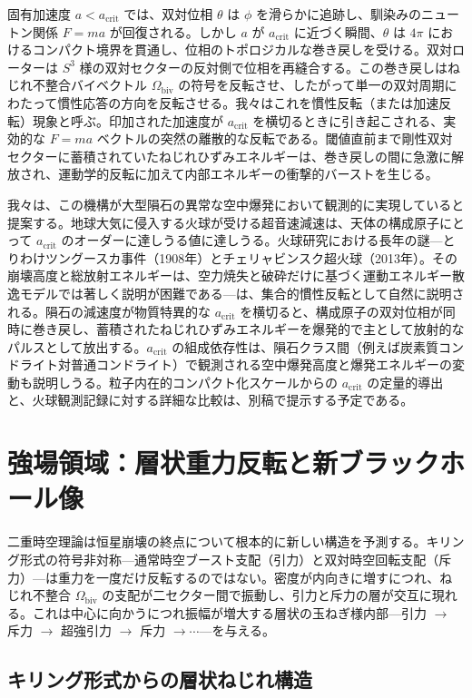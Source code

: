 \documentclass[dvipdfmx,a4paper]{article}
\begin{document}
固有加速度 $a < a_\text{crit}$ では、双対位相 $\theta$ は $\phi$ を滑らかに追跡し、馴染みのニュートン関係 $F = ma$ が回復される。しかし $a$ が $a_\text{crit}$ に近づく瞬間、$\theta$ は $4\pi$ におけるコンパクト境界を貫通し、位相のトポロジカルな巻き戻しを受ける。双対ローターは $S^3$ 様の双対セクターの反対側で位相を再縫合する。この巻き戻しはねじれ不整合バイベクトル $\Omega_\text{biv}$ の符号を反転させ、したがって単一の双対周期にわたって慣性応答の方向を反転させる。我々はこれを慣性反転（または加速反転）現象と呼ぶ。印加された加速度が $a_\text{crit}$ を横切るときに引き起こされる、実効的な $F = ma$ ベクトルの突然の離散的な反転である。閾値直前まで剛性双対セクターに蓄積されていたねじれひずみエネルギーは、巻き戻しの間に急激に解放され、運動学的反転に加えて内部エネルギーの衝撃的バーストを生じる。

我々は、この機構が大型隕石の異常な空中爆発において観測的に実現していると提案する。地球大気に侵入する火球が受ける超音速減速は、天体の構成原子にとって $a_\text{crit}$ のオーダーに達しうる値に達しうる。火球研究における長年の謎---とりわけツングースカ事件（1908年）とチェリャビンスク超火球（2013年）。その崩壊高度と総放射エネルギーは、空力焼失と破砕だけに基づく運動エネルギー散逸モデルでは著しく説明が困難である---は、集合的慣性反転として自然に説明される。隕石の減速度が物質特異的な $a_\text{crit}$ を横切ると、構成原子の双対位相が同時に巻き戻し、蓄積されたねじれひずみエネルギーを爆発的で主として放射的なパルスとして放出する。$a_\text{crit}$ の組成依存性は、隕石クラス間（例えば炭素質コンドライト対普通コンドライト）で観測される空中爆発高度と爆発エネルギーの変動も説明しうる。粒子内在的コンパクト化スケールからの $a_\text{crit}$ の定量的導出と、火球観測記録に対する詳細な比較は、別稿で提示する予定である。

\section{強場領域：層状重力反転と新ブラックホール像}
\label{sec:strongfield}

二重時空理論は恒星崩壊の終点について根本的に新しい構造を予測する。キリング形式の符号非対称---通常時空ブースト支配（引力）と双対時空回転支配（斥力）---は重力を一度だけ反転するのではない。密度が内向きに増すにつれ、ねじれ不整合 $\Omega_\text{biv}$ の支配が二セクター間で振動し、引力と斥力の層が交互に現れる。これは中心に向かうにつれ振幅が増大する層状の玉ねぎ様内部---引力 $\to$ 斥力 $\to$ 超強引力 $\to$ 斥力 $\to \cdots$---を与える。

\subsection{キリング形式からの層状ねじれ構造}
\end{document}
